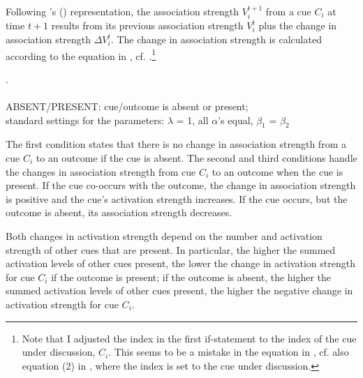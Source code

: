 Following \citeauthor{Baayenetal:2011}'s (\citeyear[450]{Baayenetal:2011}) representation, 
the association strength $V_{i}^{t + 1}$ from a cue $C_{i}$ at time
$t + 1$ results from its previous association strength $V_{i}^{t}$ plus the change in
association strength $\Delta V_{i}^{t}$. The change in association
strength is calculated according to the equation in \Next,
cf. \citet[450]{Baayenetal:2011}.\footnote{Note that I adjusted the
  index in the first if-statement to the index of the cue under
  discussion, $C_{i}$. This seems to be a mistake in the equation in
  \citet[450]{Baayenetal:2011}, cf. also equation (2) in
  \citet[299]{Baayen:2011}, where the index is set to the cue under discussion.}


\ex.  
\\\vspace*{.5em}
{}\\
ABSENT/PRESENT: cue/outcome is absent or present;\\ standard settings for the parameters:
$\lambda$ = 1, all $\alpha$'s equal, $\beta_1$ = $\beta_2$


The first condition states that there is no change in association
strength from a cue $C_{i}$ to an outcome if the cue is absent. The
second and third conditions handle the changes in association strength
from cue $C_{i}$ to an outcome when the cue is present. If the cue
co-occurs with the outcome, the change in association strength is
positive and the cue's activation strength increases. If the cue
occurs, but the outcome is absent, its association strength decreases.

Both changes in activation strength depend on the number and
activation strength of other cues that are present. In particular, the higher
the summed activation levels of other cues present, the lower
the change in activation strength for cue $C_{i}$ if the outcome is present; if
the outcome is absent, the higher
the summed activation levels of other cues present, the higher the
negative change in activation strength for cue $C_{i}$.

